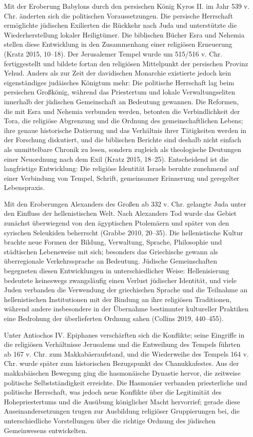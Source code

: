 \documentclass[fontsize=12pt]{mybib}
\begin{document}
Mit der Eroberung Babylons durch den persischen König Kyros II. im Jahr 539 v. Chr. änderten sich die politischen Voraussetzungen. Die persische Herrschaft ermöglichte jüdischen Exilierten die Rückkehr nach Juda und unterstützte die Wiederherstellung lokaler Heiligtümer. Die biblischen Bücher Esra und Nehemia stellen diese Entwicklung in den Zusammenhang einer religiösen Erneuerung (Kratz 2015, 10–18). Der Jerusalemer Tempel wurde um 515/516 v. Chr. fertiggestellt und bildete fortan den religiösen Mittelpunkt der persischen Provinz Yehud. Anders als zur Zeit der davidischen Monarchie existierte jedoch kein eigenständiges judäisches Königtum mehr: Die politische Herrschaft lag beim persischen Großkönig, während das Priestertum und lokale Verwaltungseliten innerhalb der jüdischen Gemeinschaft an Bedeutung gewannen. Die Reformen, die mit Esra und Nehemia verbunden werden, betonten die Verbindlichkeit der Tora, die religiöse Abgrenzung und die Ordnung des gemeinschaftlichen Lebens; ihre genaue historische Datierung und das Verhältnis ihrer Tätigkeiten werden in der Forschung diskutiert, und die biblischen Berichte sind deshalb nicht einfach als unmittelbare Chronik zu lesen, sondern zugleich als theologische Deutungen einer Neuordnung nach dem Exil (Kratz 2015, 18–25). Entscheidend ist die langfristige Entwicklung: Die religiöse Identität Israels beruhte zunehmend auf einer Verbindung von Tempel, Schrift, gemeinsamer Erinnerung und geregelter Lebenspraxis.

Mit den Eroberungen Alexanders des Großen ab 332 v. Chr. gelangte Juda unter den Einfluss der hellenistischen Welt. Nach Alexanders Tod wurde das Gebiet zunächst überwiegend von den ägyptischen Ptolemäern und später von den syrischen Seleukiden beherrscht (Grabbe 2010, 20–35). Die hellenistische Kultur brachte neue Formen der Bildung, Verwaltung, Sprache, Philosophie und städtischen Lebensweise mit sich; besonders das Griechische gewann als überregionale Verkehrssprache an Bedeutung. Jüdische Gemeinschaften begegneten diesen Entwicklungen in unterschiedlicher Weise: Hellenisierung bedeutete keineswegs zwangsläufig einen Verlust jüdischer Identität, und viele Juden verbanden die Verwendung der griechischen Sprache und die Teilnahme an hellenistischen Institutionen mit der Bindung an ihre religiösen Traditionen, während andere insbesondere in der Übernahme bestimmter kultureller Praktiken eine Bedrohung der überlieferten Ordnung sahen (Collins 2019, 440–455).

Unter Antiochos IV. Epiphanes verschärften sich die Konflikte; seine Eingriffe in die religiösen Verhältnisse Jerusalems und die Entweihung des Tempels führten ab 167 v. Chr. zum Makkabäeraufstand, und die Wiederweihe des Tempels 164 v. Chr. wurde später zum historischen Bezugspunkt des Chanukkafestes. Aus der makkabäischen Bewegung ging die hasmonäische Dynastie hervor, die zeitweise politische Selbstständigkeit erreichte. Die Hasmonäer verbanden priesterliche und politische Herrschaft, was jedoch neue Konflikte über die Legitimität des Hohepriestertums und die Ausübung königlicher Macht hervorrief; gerade diese Auseinandersetzungen trugen zur Ausbildung religiöser Gruppierungen bei, die unterschiedliche Vorstellungen über die richtige Ordnung des jüdischen Gemeinwesens entwickelten.
\end{document}
